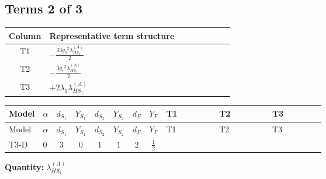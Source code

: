 \documentclass[8pt]{article}
\begin{document}
\begin{landscape}
\subsection*{Terms 2 of 3}
\begin{center}
\begin{tabular}{@{}c >{\raggedright\arraybackslash}p{0.82\linewidth}@{}}
\toprule
Column & Representative term structure \\
\midrule
T1 & \(\displaystyle -\frac{33 {g_2}^2 {\lambda_{HS_1}^{(A)}}}{2}\) \\
\midrule
T2 & \(\displaystyle -\frac{3 {g_1}^2 {\lambda_{HS_1}^{(A)}}}{2}\) \\
\midrule
T3 & \(\displaystyle +2 {\lambda_1} {\lambda_{HS_1}^{(A)}}\) \\
\midrule
\bottomrule
\end{tabular}
\end{center}
\smallskip
\tiny
\begin{longtable}{@{}llcccccc >{\raggedright\arraybackslash}p{0.21\linewidth} >{\raggedright\arraybackslash}p{0.21\linewidth} >{\raggedright\arraybackslash}p{0.21\linewidth}@{}}
\toprule
Model & $\alpha$ & $d_{S_1}$ & $Y_{S_1}$ & $d_{S_2}$ & $Y_{S_2}$ & $d_F$ & $Y_F$ & T1 & T2 & T3 \\
\midrule
\endfirsthead
\toprule
Model & $\alpha$ & $d_{S_1}$ & $Y_{S_1}$ & $d_{S_2}$ & $Y_{S_2}$ & $d_F$ & $Y_F$ & T1 & T2 & T3 \\
\midrule
\endhead
T3-D & $0$ & $3$ & $0$ & $1$ & $1$ & $2$ & $\frac{1}{2}$ & \scriptsize\adjustbox{max width=\linewidth}{$\begin{gathered} -\frac{33 {g_2}^2 {\lambda_{HS_1}^{(A)}}}{2}\end{gathered}$} & \scriptsize\adjustbox{max width=\linewidth}{$\begin{gathered} -\frac{3 {g_1}^2 {\lambda_{HS_1}^{(A)}}}{2}\end{gathered}$} & \scriptsize\adjustbox{max width=\linewidth}{$\begin{gathered} +2 {\lambda_1} {\lambda_{HS_1}^{(A)}}\end{gathered}$} \\
\midrule
\bottomrule
\end{longtable}
\clearpage
\noindent\textbf{Quantity: }$\lambda_{HS_1}^{(A)}$\par\smallskip

\end{landscape}
\end{document}
